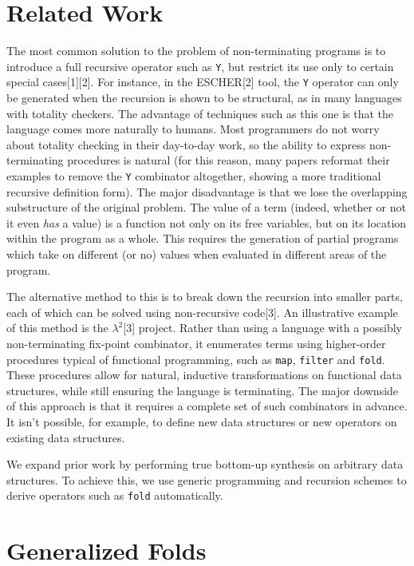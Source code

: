 \documentclass[acmsmall,screen]{acmart}
\begin{document}
\section{Related Work}

The most common solution to the problem of non-terminating programs is to introduce a full recursive operator such as \verb|Y|, but restrict its use only to certain special cases[1][2]. For instance, in the ESCHER[2] tool, the \verb|Y| operator can only be generated when the recursion is shown to be structural, as in many languages with totality checkers. The advantage of techniques such as this one is that the language comes more naturally to humans. Most programmers do not worry about totality checking in their day-to-day work, so the ability to express non-terminating procedures is natural (for this reason, many papers reformat their examples to remove the \verb|Y| combinator altogether, showing a more traditional recursive definition form). The major disadvantage is that we lose the overlapping substructure of the original problem. The value of a term (indeed, whether or not it even \textit{has} a value) is a function not only on its free variables, but on its location within the program as a whole. This requires the generation of partial programs which take on different (or no) values when evaluated in different areas of the program.

The alternative method to this is to break down the recursion into smaller parts, each of which can be solved using non-recursive code[3]. An illustrative example of this method is the $\lambda^2$[3] project. Rather than using a language with a possibly non-terminating fix-point combinator, it enumerates terms using higher-order procedures typical of functional programming, such as \texttt{map}, \texttt{filter} and \texttt{fold}. These procedures allow for natural, inductive transformations on functional data structures, while still ensuring the language is terminating. The major downside of this approach is that it requires a complete set of such combinators in advance. It isn't possible, for example, to define new data structures or new operators on existing data structures. 

We expand prior work by performing true bottom-up synthesis on arbitrary data structures. To achieve this, we use generic programming and recursion schemes to derive operators such as \texttt{fold} automatically.

\section{Generalized Folds}
\end{document}
